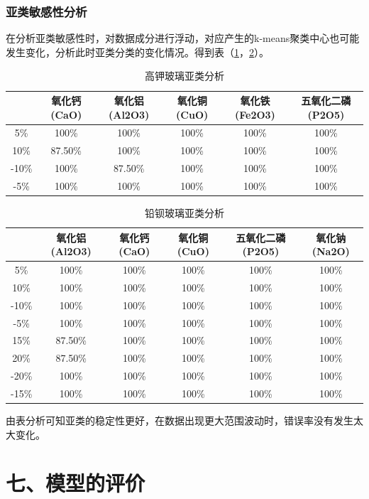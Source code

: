 \documentclass{my_paper}
\begin{document}
\subsubsection{亚类敏感性分析}
在分析亚类敏感性时，对数据成分进行浮动，对应产生的k-means聚类中心也可能发生变化，分析此时亚类分类的变化情况。得到表（\ref{sen3}，\ref{sen4}）。
\begin{longtable}{cccccc}
\caption{高钾玻璃亚类分析}
\label{sen3} \\
\toprule
& 氧化钙(CaO) & 氧化铝(Al2O3) & 氧化铜(CuO) & 氧化铁(Fe2O3) & 五氧化二磷(P2O5) \\\midrule
5\%   & 100\%    & 100\%      & 100\%    & 100\%      & 100\%       \\
10\%  & 87.50\%  & 100\%      & 100\%    & 100\%      & 100\%       \\
-10\% & 100\%    & 87.50\%    & 100\%    & 100\%      & 100\%       \\
-5\%  & 100\%    & 100\%      & 100\%    & 100\%      & 100\%       \\
\bottomrule
\end{longtable}  

\begin{longtable}{cccccc}
  \caption{铅钡玻璃亚类分析}
  \label{sen4} \\
  \toprule
  & 氧化铝(Al2O3) & 氧化钙(CaO) & 氧化铜(CuO) & 五氧化二磷(P2O5) & 氧化钠(Na2O) \\\midrule
  5\%   & 100\%      & 100\%    & 100\%    & 100\%       & 100\%     \\
  10\%  & 100\%      & 100\%    & 100\%    & 100\%       & 100\%     \\
  -10\% & 100\%      & 100\%    & 100\%    & 100\%       & 100\%     \\
  -5\%  & 100\%      & 100\%    & 100\%    & 100\%       & 100\%     \\
  15\%  & 87.50\%    & 100\%    & 100\%    & 100\%       & 100\%     \\
  20\%  & 87.50\%    & 100\%    & 100\%    & 100\%       & 100\%     \\
  -20\% & 100\%      & 100\%    & 100\%    & 100\%       & 100\%     \\
  -15\% & 100\%      & 100\%    & 100\%    & 100\%       & 100\%     \\
  \bottomrule
  \end{longtable}  

  由表分析可知亚类的稳定性更好，在数据出现更大范围波动时，错误率没有发生太大变化。
\section{七、模型的评价}
\end{document}

